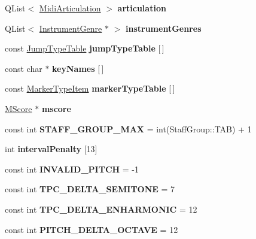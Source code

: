 \begin{DoxyCompactItemize}
Q\+List$<$ \hyperlink{struct_ms_1_1_midi_articulation}{Midi\+Articulation} $>$ {\bfseries articulation}
\item 
\mbox{\label{namespace_ms_aed8241dbbac00b62e053479432d545ea}} 
Q\+List$<$ \hyperlink{class_ms_1_1_instrument_genre}{Instrument\+Genre} $\ast$ $>$ {\bfseries instrument\+Genres}
\item 
const \hyperlink{struct_ms_1_1_jump_type_table}{Jump\+Type\+Table} {\bfseries jump\+Type\+Table} \mbox{[}$\,$\mbox{]}
\item 
const char $\ast$ {\bfseries key\+Names} \mbox{[}$\,$\mbox{]}
\item 
const \hyperlink{struct_ms_1_1_marker_type_item}{Marker\+Type\+Item} {\bfseries marker\+Type\+Table} \mbox{[}$\,$\mbox{]}
\item 
\mbox{\label{namespace_ms_aed34af612b7e7463508b8c0409067a90}} 
\hyperlink{class_ms_1_1_m_score}{M\+Score} $\ast$ {\bfseries mscore}
\item 
\mbox{\label{namespace_ms_aa1720b8d90edf8d06388cb0a2d5baa3a}} 
const int {\bfseries S\+T\+A\+F\+F\+\_\+\+G\+R\+O\+U\+P\+\_\+\+M\+AX} = int(Staff\+Group\+::\+T\+AB) + 1
\item 
int {\bfseries interval\+Penalty} \mbox{[}13\mbox{]}
\item 
\mbox{\label{namespace_ms_a307bd42b339695e112b0369452663f1a}} 
const int {\bfseries I\+N\+V\+A\+L\+I\+D\+\_\+\+P\+I\+T\+CH} = -\/1
\item 
\mbox{\label{namespace_ms_abe25256a2bb3aac0ce11717a7babaced}} 
const int {\bfseries T\+P\+C\+\_\+\+D\+E\+L\+T\+A\+\_\+\+S\+E\+M\+I\+T\+O\+NE} = 7
\item 
\mbox{\label{namespace_ms_a0d37f4d29b6a14198b6dfc98c361bf94}} 
const int {\bfseries T\+P\+C\+\_\+\+D\+E\+L\+T\+A\+\_\+\+E\+N\+H\+A\+R\+M\+O\+N\+IC} = 12
\item 
\mbox{\label{namespace_ms_aa0e3441e4ccdb772780d607f656e8369}} 
const int {\bfseries P\+I\+T\+C\+H\+\_\+\+D\+E\+L\+T\+A\+\_\+\+O\+C\+T\+A\+VE} = 12
\item 
\mbox{\label{namespace_ms_ad31031ecf648ffaa5865db8bf94d19c4}} 

\end{DoxyCompactItemize}
